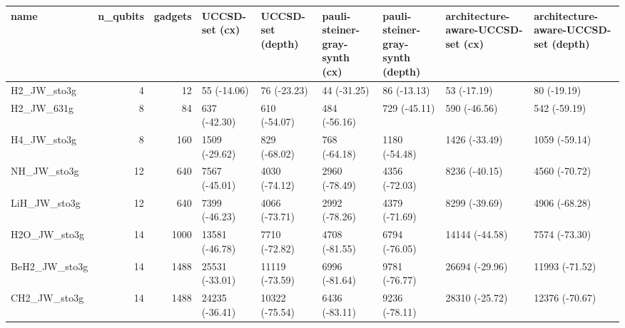 \begin{tabular}{lrrllllll}
\toprule
name & n\_qubits & gadgets & UCCSD-set (cx) & UCCSD-set (depth) & pauli-steiner-gray-synth (cx) & pauli-steiner-gray-synth (depth) & architecture-aware-UCCSD-set (cx) & architecture-aware-UCCSD-set (depth) \\
\midrule
H2\_JW\_sto3g & 4 & 12 & 55 (-14.06) & 76 (-23.23) & 44 (-31.25) & 86 (-13.13) & 53 (-17.19) & 80 (-19.19) \\
H2\_JW\_631g & 8 & 84 & 637 (-42.30) & 610 (-54.07) & 484 (-56.16) & 729 (-45.11) & 590 (-46.56) & 542 (-59.19) \\
H4\_JW\_sto3g & 8 & 160 & 1509 (-29.62) & 829 (-68.02) & 768 (-64.18) & 1180 (-54.48) & 1426 (-33.49) & 1059 (-59.14) \\
NH\_JW\_sto3g & 12 & 640 & 7567 (-45.01) & 4030 (-74.12) & 2960 (-78.49) & 4356 (-72.03) & 8236 (-40.15) & 4560 (-70.72) \\
LiH\_JW\_sto3g & 12 & 640 & 7399 (-46.23) & 4066 (-73.71) & 2992 (-78.26) & 4379 (-71.69) & 8299 (-39.69) & 4906 (-68.28) \\
H2O\_JW\_sto3g & 14 & 1000 & 13581 (-46.78) & 7710 (-72.82) & 4708 (-81.55) & 6794 (-76.05) & 14144 (-44.58) & 7574 (-73.30) \\
BeH2\_JW\_sto3g & 14 & 1488 & 25531 (-33.01) & 11119 (-73.59) & 6996 (-81.64) & 9781 (-76.77) & 26694 (-29.96) & 11993 (-71.52) \\
CH2\_JW\_sto3g & 14 & 1488 & 24235 (-36.41) & 10322 (-75.54) & 6436 (-83.11) & 9236 (-78.11) & 28310 (-25.72) & 12376 (-70.67) \\
\bottomrule
\end{tabular}
